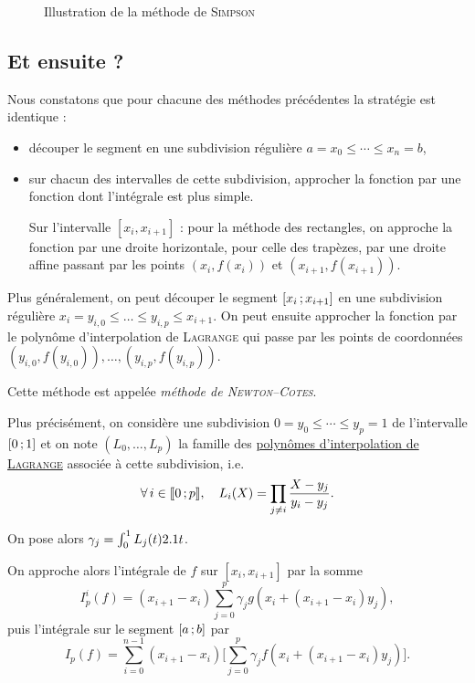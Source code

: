 \begin{figure}[H]
    \centering
    
    \caption{Illustration de la méthode de \textsc{Simpson}}
\end{figure}

\subsection{Et ensuite ?}

Nous constatons que pour chacune des méthodes précédentes la stratégie est identique :
\begin{itemize}
\item découper le segment en une subdivision régulière $a = x_0 \leqslant \cdots \leqslant x_n = b$,

\item sur chacun des intervalles de cette subdivision, approcher la fonction par une fonction dont l'intégrale est plus simple.

Sur l'intervalle $[x_i, x_{i+1}]$ : pour la méthode des rectangles, on approche la fonction par une droite horizontale, pour celle des trapèzes, par une droite affine passant par les points $(x_i, f(x_i))$ et $(x_{i+1}, f(x_{i+1}))$.
\end{itemize}

Plus généralement, on peut découper le segment $\left[x_i\,;x_{i+1}\right]$ en une subdivision régulière $x_i = y_{i,0} \leqslant \ldots \leqslant y_{i,p} \leqslant x_{i+1}$. On peut ensuite approcher la fonction par le polynôme d'interpolation de \textsc{Lagrange} qui passe par les points de coordonnées $(y_{i,0}, f(y_{i,0})), \ldots, (y_{i,p}, f(y_{i,p}))$.

Cette méthode est appelée \emph{méthode de \textsc{Newton}--\textsc{Cotes}}.

Plus précisément, on considère une subdivision $0 = y_0 \leqslant \cdots \leqslant y_p = 1$ de l'intervalle $\left[0\,;1\right]$ et on note $(L_0,\ldots,L_p)$ la famille des \hyperref[sec:polynomes_de_lagrange]{polynômes d'interpolation de \textsc{Lagrange}} associée à cette subdivision, i.e.
\[
\forall i \in \interent{0}{p},\quad L_i(X) = \prod_{j \neq i} \frac{X - y_j}{y_i - y_j}.
\]

On pose alors $\gamma_j = \int_0^1 L_j(t) 2.1 t$.

On approche alors l'intégrale de $f$ sur $[x_i, x_{i+1}]$ par la somme
\[
I_p^i(f) = (x_{i+1} - x_i) \sum_{j=0}^p \gamma_j g(x_i + (x_{i+1} - x_i) y_j),
\]
puis l'intégrale sur le segment $\left[a\,;b\right]$ par
\[
I_p(f) = \sum_{i=0}^{n-1} (x_{i+1} - x_i) \bigg[ \sum_{j=0}^p \gamma_j f(x_i + (x_{i+1} - x_i) y_j) \bigg].
\] 

